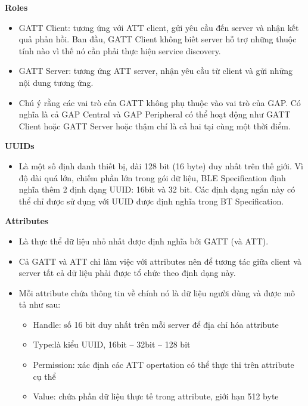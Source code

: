 \textbf{Roles}

\begin{itemize}
    \item GATT Client: tương ứng với ATT client, gửi yêu cầu đến server và nhận kết quả phản hồi. Ban đầu, GATT Client không biết server hỗ trợ những thuộc tính nào vì thế nó cần phải thực hiện service discovery.
    \item GATT Server: tương ứng ATT server, nhận yêu cầu từ client và gửi những nội dung tương ứng.
    \item Chú ý rằng các vai trò của GATT không phụ thuộc vào vai trò của GAP. Có nghĩa là cả GAP Central và GAP Peripheral có thể hoạt động như GATT Client hoặc GATT Server hoặc thậm chí là cả hai tại cùng một thời điểm.
\end{itemize}

\textbf{UUIDs}

\begin{itemize}
    \item Là một số định danh thiết bị, dài 128 bit (16 byte) duy nhất trên thế giới. Vì độ dài quá lớn, chiếm phần lớn trong gói dữ liệu, BLE Specification định nghĩa thêm 2 định dạng UUID: 16bit và 32 bit. Các định dạng ngắn này có thể chỉ được sử dụng với UUID được định nghĩa trong BT Specification.
\end{itemize}

\textbf{Attributes}

\begin{itemize}
    \item Là thực thể dữ liệu nhỏ nhất được định nghĩa bởi GATT (và ATT).
    \item Cả GATT và ATT chỉ làm việc với attributes nên để tương tác giữa client và server tất cả dữ liệu phải được tổ chức theo định dạng này.
    \item Mỗi attribute chứa thông tin về chính nó là dữ liệu người dùng và được mô tả như sau:
    \begin{itemize}
        \item Handle: số 16 bit duy nhất trên mỗi server để địa chỉ hóa attribute
        \item Type:là kiểu UUID, 16bit – 32bit – 128 bit
        \item Permission: xác định các ATT opertation có thể thực thi trên attribute cụ thể
        \item Value: chứa phần dữ liệu thực tế trong attribute, giới hạn 512 byte
    \end{itemize}
\end{itemize}

